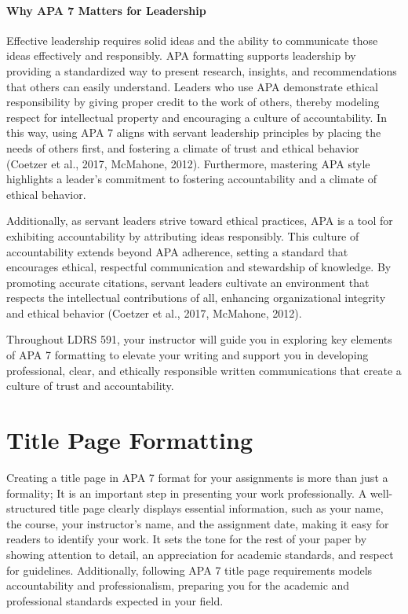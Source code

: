 \documentclass[
  letterpaper,
  DIV=11,
  numbers=noendperiod]{scrreprt}
\begin{document}
\subsubsection*{Why APA 7 Matters for
Leadership}\label{why-apa-7-matters-for-leadership}

Effective leadership requires solid ideas and the ability to communicate
those ideas effectively and responsibly. APA formatting supports
leadership by providing a standardized way to present research,
insights, and recommendations that others can easily understand. Leaders
who use APA demonstrate ethical responsibility by giving proper credit
to the work of others, thereby modeling respect for intellectual
property and encouraging a culture of accountability. In this way, using
APA 7 aligns with servant leadership principles by placing the needs of
others first, and fostering a climate of trust and ethical behavior
(Coetzer et al., 2017, McMahone, 2012). Furthermore, mastering APA style
highlights a leader's commitment to fostering accountability and a
climate of ethical behavior.

Additionally, as servant leaders strive toward ethical practices, APA is
a tool for exhibiting accountability by attributing ideas responsibly.
This culture of accountability extends beyond APA adherence, setting a
standard that encourages ethical, respectful communication and
stewardship of knowledge. By promoting accurate citations, servant
leaders cultivate an environment that respects the intellectual
contributions of all, enhancing organizational integrity and ethical
behavior (Coetzer et al., 2017, McMahone, 2012).

Throughout LDRS 591, your instructor will guide you in exploring key
elements of APA 7 formatting to elevate your writing and support you in
developing professional, clear, and ethically responsible written
communications that create a culture of trust and accountability.


\chapter*{Title Page Formatting}\label{title-page-formatting}


Creating a title page in APA 7 format for your assignments is more than
just a formality; It is an important step in presenting your work
professionally. A well-structured title page clearly displays essential
information, such as your name, the course, your instructor's name, and
the assignment date, making it easy for readers to identify your work.
It sets the tone for the rest of your paper by showing attention to
detail, an appreciation for academic standards, and respect for
guidelines. Additionally, following APA 7 title page requirements models
accountability and professionalism, preparing you for the academic and
professional standards expected in your field.
\end{document}
